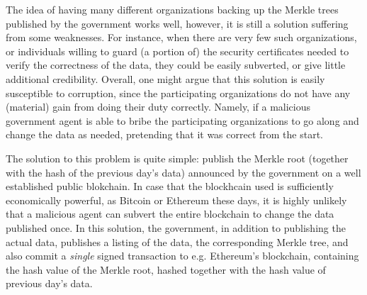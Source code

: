 

The idea of having many different organizations backing up the Merkle trees published by the government works well, however, it is still a solution suffering from some weaknesses. For instance, when there are very few such organizations, or individuals willing to guard (a portion of) the security certificates needed to verify the correctness of the data, they could be easily subverted, or give little additional credibility. Overall, one might argue that this solution is easily susceptible to corruption, since the participating organizations do not have any (material) gain from doing their duty correctly. Namely, if a malicious government agent is able to bribe the participating organizations to go along and change the data as needed, pretending that it was correct from the start. %


The solution to this problem is quite simple: publish the Merkle root (together with the hash of the previous day's data) announced by the government on a well established public blokchain. In case that the blockhcain used is sufficiently economically powerful, as Bitcoin or Ethereum these days, it is highly unlikely that a malicious agent can subvert the entire blockchain to change the data published once. In this solution, the government, in addition to publishing the actual data, publishes a listing of the data, the corresponding Merkle tree, and also commit a {\em single} signed transaction to e.g. Ethereum's blockchain, containing the hash value of the Merkle root, hashed together with the hash value of previous day's data.

